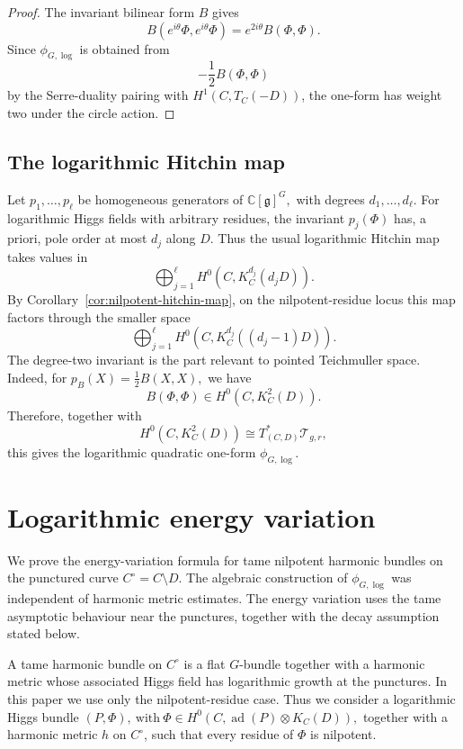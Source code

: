 \documentclass[11pt,reqno]{amsart}
\numberwithin{equation}{section}
\theoremstyle{plain}
\theoremstyle{definition}
\theoremstyle{remark}
\begin{document}
\begin{proof}
The invariant bilinear form \(B\) gives
\[
        B(e^{i\theta}\Phi,e^{i\theta}\Phi)
        =
        e^{2i\theta}B(\Phi,\Phi).
\]
Since \(\phi_{G,\log}\) is obtained from
\[
        -\frac12B(\Phi,\Phi)
\]
by the Serre-duality pairing with \(H^1(C,T_C(-D))\), the one-form has weight
two under the circle action.
\end{proof}


\subsection{The logarithmic Hitchin map}

Let
\(
        p_1,\ldots,p_\ell
\)
be homogeneous generators of
\(
        \mathbb C[\mathfrak g]^G,
\)
with degrees
\(
        d_1,\ldots,d_\ell.
\)
For logarithmic Higgs fields with arbitrary residues, the invariant
\(p_j(\Phi)\) has, a priori, pole order at most \(d_j\) along \(D\). Thus the
usual logarithmic Hitchin map takes values in
\[
        \bigoplus_{j=1}^{\ell}
        H^0(C,K_C^{d_j}(d_jD)).
\]
By Corollary~\ref{cor:nilpotent-hitchin-map}, on the nilpotent-residue locus
this map factors through the smaller space
\[
        \bigoplus_{j=1}^{\ell}
        H^0(C,K_C^{d_j}((d_j-1)D)).
\]
The degree-two invariant is the part relevant to pointed Teichmuller space.
Indeed, for
\(
        p_B(X)=\frac12B(X,X),
\)
we have
\[
        B(\Phi,\Phi)\in H^0(C,K_C^2(D)).
\]
Therefore, together with
\[
        H^0(C,K_C^2(D))
        \cong
        T^*_{(C,D)}\mathcal T_{g,r},
\]
this gives the logarithmic quadratic one-form
\(
        \phi_{G,\log}.
\)



\section{Logarithmic energy variation}
\label{sec:energy}

We prove the energy-variation formula for tame nilpotent harmonic bundles on
the punctured curve
\(
        C^\circ=C\setminus D.
\)
The algebraic construction of \(\phi_{G,\log}\) was independent of harmonic
metric estimates. The energy variation uses the tame asymptotic behaviour near
the punctures, together with the decay assumption stated below.

A tame harmonic bundle on \(C^\circ\) is a flat \(G\)-bundle together
with a harmonic metric whose associated Higgs field has logarithmic growth at
the punctures. In this paper we use only the nilpotent-residue case. Thus we consider a logarithmic Higgs bundle
\(
        (P,\Phi),
        \ \text{with}\
        \Phi\in H^0(C,\operatorname{ad}(P)\otimes K_C(D)),
\)
together with a harmonic metric \(h\) on \(C^\circ\), such that every residue of
\(\Phi\) is nilpotent. 
\end{document}
